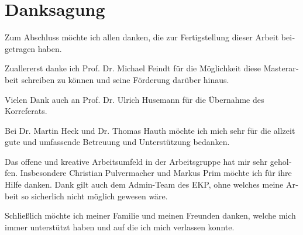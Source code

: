 \chapter*{Danksagung}
\begin{otherlanguage}{ngerman}
Zum Abschluss möchte ich allen danken, die zur Fertigstellung dieser Arbeit beigetragen haben.

Zuallererst danke ich Prof. Dr. Michael Feindt für die Möglichkeit diese Masterarbeit schreiben zu können und seine Förderung darüber hinaus.

Vielen Dank auch an Prof. Dr. Ulrich Husemann für die Übernahme des Korreferats.

Bei Dr. Martin Heck und Dr. Thomas Hauth möchte ich mich sehr für die allzeit gute und umfassende Betreuung und Unterstützung bedanken.

Das offene und kreative Arbeitsumfeld in der Arbeitsgruppe hat mir sehr geholfen. Insbesondere Christian Pulvermacher und Markus Prim möchte ich für ihre Hilfe danken. Dank gilt auch dem Admin-Team des EKP, ohne welches meine Arbeit so sicherlich nicht möglich gewesen wäre.

Schließlich möchte ich meiner Familie und meinen Freunden danken, welche mich immer unterstützt haben und auf die ich mich verlassen konnte.
\end{otherlanguage}